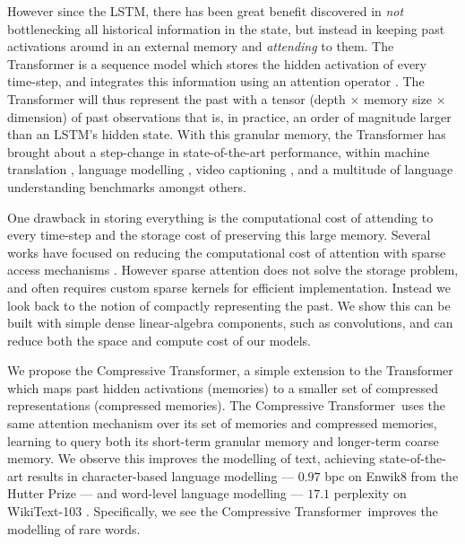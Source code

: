 However since the LSTM, there has been great benefit discovered in \textit{not} bottlenecking all historical information in the state, but instead in keeping past activations around in an external memory and \textit{attending} to them. The Transformer \citep{vaswani2017attention} is a sequence model which stores the hidden activation of every time-step, and integrates this information using an attention operator \citep{bahdanau2014neural}. The Transformer will thus represent the past with a tensor (depth $\times$ memory size $\times$ dimension) of past observations that is, in practice, an order of magnitude larger than an LSTM's hidden state.  With this granular memory, the Transformer has brought about a step-change in state-of-the-art performance, within machine translation \citep{vaswani2017attention}, language modelling \citep{dai2019transformer, shoeybi2019megatronlm}, video captioning \citep{zhou2018end}, and a multitude of language understanding benchmarks \citep{devlin2018bert, yang2019xlnet} amongst others.

One drawback in storing everything is the computational cost of attending to every time-step and the storage cost of preserving this large memory. Several works have focused on reducing the computational cost of attention with sparse access mechanisms \citep{rae2016scaling, child2019generating, sukhbaatar2019adaptive, lample2019large}. However sparse attention does not solve the storage problem, and often requires custom sparse kernels for efficient implementation. Instead we look back to the notion of compactly representing the past. We show this can be built with simple dense linear-algebra components, such as convolutions, and can reduce both the space and compute cost of our models.

We propose the Compressive Transformer, a simple extension to the Transformer which maps past hidden activations (memories) to a smaller set of compressed representations (compressed memories). The Compressive Transformer~uses the same attention mechanism over its set of memories and compressed memories, learning to query both its short-term granular memory and longer-term coarse memory. We observe this improves the modelling of text, achieving state-of-the-art results in character-based language modelling --- $0.97$ bpc on Enwik8 from the Hutter Prize \citep{hutter2012human} --- and word-level language modelling --- $17.1$ perplexity on WikiText-103 \citep{merity2016pointer}. Specifically, we see the Compressive Transformer~improves the modelling of rare words.

